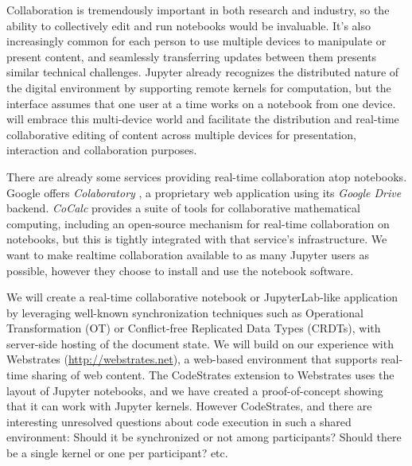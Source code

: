 \begin{task}[
  title=Multi-device Real-time Collaboration,
  id=collaboration,
  lead=UPSUD,
  PM=24,       %
  wphases={0-48!.5},
  partners={EP,QS,XFEL}
]


Collaboration is tremendously important in both research and industry,
so the ability to collectively edit and run notebooks would be invaluable.
It's also increasingly common for each person to use multiple devices to
manipulate or present content, and seamlessly transferring updates between them
presents similar technical challenges.
Jupyter already recognizes the distributed nature of the digital environment by supporting remote kernels for computation,
but the interface assumes that one user at a time works on a notebook from
one device.
\TheProject will embrace this multi-device world and facilitate the distribution and
real-time collaborative editing of content across multiple devices for presentation, interaction and collaboration purposes.

There are already some services providing real-time collaboration atop
notebooks. Google offers \emph{Colaboratory} \cite{Colab}, a proprietary
web application using its \emph{Google Drive} backend.
\emph{CoCalc} \cite{Cocalc} provides a suite of tools for collaborative
mathematical computing, including an open-source mechanism for real-time
collaboration on notebooks, but this is tightly integrated with that service's
infrastructure.
We want to make realtime collaboration available to as many Jupyter users as
possible, however they choose to install and use the notebook software.

We will create a real-time collaborative notebook or JupyterLab-like application by leveraging well-known synchronization techniques such as Operational Transformation (OT) or Conflict-free Replicated Data Types (CRDTs), with server-side hosting of the document state. 
We will build on our experience with Webstrates (\url{http://webstrates.net}), a web-based environment that supports real-time sharing of web content. The CodeStrates extension to Webstrates uses the layout of Jupyter notebooks, and we have created a proof-of-concept showing that it can work with Jupyter kernels. However CodeStrates, and there are interesting unresolved questions about code execution in such a shared environment: Should it be synchronized or not among participants? Should there be a single kernel or one per participant? etc.


\end{task}
